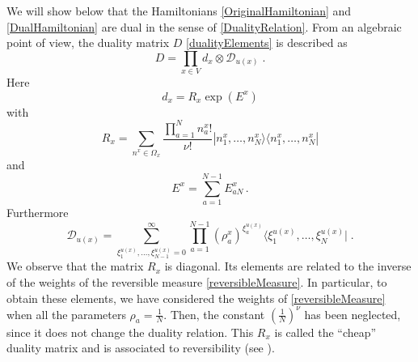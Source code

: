 \documentclass[10pt]{article}
\numberwithin{equation}{section}
\numberwithin{equation}{subsection}
\newcommand{\dt}{\;.}
\newcommand{\dd}{\mathcal{D}_{u(x)}}
\begin{document}
We will show below that the Hamiltonians \eqref{OriginalHamiltonian} and \eqref{DualHamiltonian} are dual in the sense of \eqref{DualityRelation}. From an algebraic point of view, the duality matrix $D$ \eqref{dualityElements} is described as 
\begin{equation}\label{dualityMatrix}
    D=\prod_{x\in V}d_{x}\otimes \dd \;.
\end{equation}
Here
\begin{equation}\label{bulkElementDualityMatrix}
d_{x}=R_{x}\exp{(E^{x})}
\end{equation}
with 
\begin{equation}\label{Revmatrix}
    R_{x}=\sum_{n^{x}\in\Omega_{x}}\frac{\prod_{a=1}^{N}n_{a}^{x}!}{\nu!}|n_{1}^{x},\ldots,n_{N}^{x}\rangle\langle n_{1}^{x},\ldots,n_{N}^{x}|
\end{equation}
and
\begin{equation}\label{EquationEx}
E^{x}=\sum_{a=1}^{N-1}E_{aN}^{x}\,.
\end{equation}
Furthermore
\begin{equation}\label{dualityMatrix2}
\dd=\sum_{\xi_{1}^{u(x)},\ldots,\xi_{N-1}^{u(x)}=0}^{\infty}\prod_{a=1}^{N-1}\left(\rho_{a}^{x}\right)^{\xi_{a}^{u(x)}}\langle \xi_{1}^{u(x)},\ldots,\xi_{N}^{u(x)}|\dt
\end{equation}
We observe that the matrix $R_{x}$ is diagonal. Its elements are related to the inverse of the weights of the reversible measure \eqref{reversibleMeasure}. In particular, to obtain these elements, we have considered the weights of \eqref{reversibleMeasure} when all the parameters $\rho_{a}=\frac{1}{N}$. Then, the constant $\left(\frac{1}{N}\right)^{\nu}$ has been neglected, since it does not change the duality relation. This $R_{x}$ is called the ``cheap'' duality matrix and is associated to reversibility (see \cite{giardina2009duality}). \\
\end{document}
